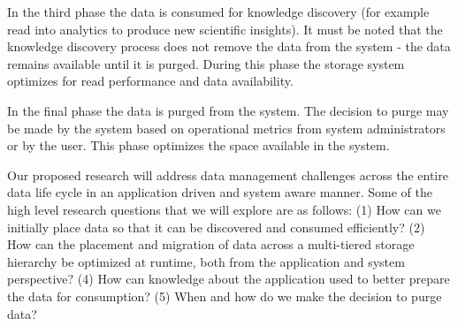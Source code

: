 In the third phase the data is consumed for knowledge discovery (for example
read into analytics to produce new scientific insights). It must be noted
that the knowledge discovery process does not remove the data from the
system - the data remains available until it is purged. During this phase
the storage system optimizes for read performance and data availability. 

In the final phase the data is purged from the system. The
decision to purge may be made by the system based on operational metrics from
system administrators or by the user. This phase optimizes the space available in the
system. %

Our proposed research will address data management challenges across the entire 
data life cycle in an application driven and system aware manner. 
Some of the high level research questions that we will explore are as follows: 
(1) How can we initially place data so that it can be discovered and consumed efficiently?
(2) How can the placement and migration of data across a multi-tiered storage hierarchy be 
optimized at runtime, both from the application and system perspective?
(4) How can knowledge about the application used to better prepare the data for consumption? 
(5) When and how do we make the decision to purge data?  %





